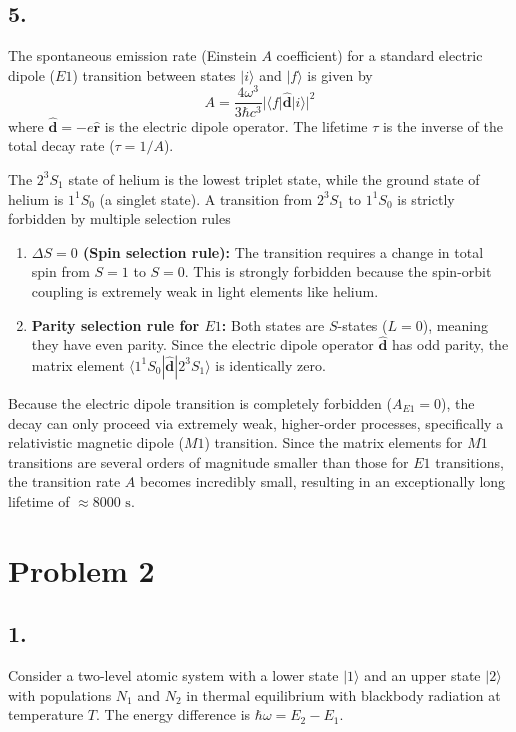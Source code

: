 \documentclass[11pt,a4paper]{article}
\begin{document}
\subsection*{5.}
The spontaneous emission rate (Einstein $A$ coefficient) for a standard electric dipole ($E1$) transition between states $|i\rangle$ and $|f\rangle$ is given by
\[
A = \frac{4\omega^3}{3\hbar c^3} |\langle f | \hat{\mathbf{d}} | i \rangle|^2
\]
where $\hat{\mathbf{d}} = -e\hat{\mathbf{r}}$ is the electric dipole operator. The lifetime $\tau$ is the inverse of the total decay rate ($\tau = 1/A$).

The $2^{3}S_{1}$ state of helium is the lowest triplet state, while the ground state of helium is $1^{1}S_{0}$ (a singlet state). A transition from $2^{3}S_{1}$ to $1^{1}S_{0}$ is strictly forbidden by multiple selection rules
\begin{enumerate}
    \item \textbf{$\Delta S = 0$ (Spin selection rule):} The transition requires a change in total spin from $S=1$ to $S=0$. This is strongly forbidden because the spin-orbit coupling is extremely weak in light elements like helium.
    \item \textbf{Parity selection rule for $E1$:} Both states are $S$-states ($L=0$), meaning they have even parity. Since the electric dipole operator $\hat{\mathbf{d}}$ has odd parity, the matrix element $\langle 1^{1}S_{0} | \hat{\mathbf{d}} | 2^{3}S_{1} \rangle$ is identically zero.
\end{enumerate}
Because the electric dipole transition is completely forbidden ($A_{E1} = 0$), the decay can only proceed via extremely weak, higher-order processes, specifically a relativistic magnetic dipole ($M1$) transition. Since the matrix elements for $M1$ transitions are several orders of magnitude smaller than those for $E1$ transitions, the transition rate $A$ becomes incredibly small, resulting in an exceptionally long lifetime of $\approx 8000\text{ s}$.

\section*{Problem 2}

\subsection*{1.}
Consider a two-level atomic system with a lower state $|1\rangle$ and an upper state $|2\rangle$ with populations $N_1$ and $N_2$ in thermal equilibrium with blackbody radiation at temperature $T$. The energy difference is $\hbar\omega = E_2 - E_1$.
\end{document}
